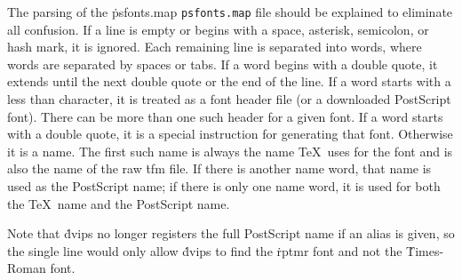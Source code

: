 The parsing of the \.{psfonts.map}
\^{{\tt psfonts.map}}
file should be explained to eliminate all confusion.  If a line is
empty or begins with a space, asterisk, semicolon, or hash mark, it is
ignored.  Each remaining line is separated into words, where words are
separated by spaces or tabs.  If a word begins with a double quote, it
extends until the next double quote or the end of the line.  If a word
starts with a less than character, it is treated as a font header file
(or a downloaded PostScript font).  There can be more than one such
header for a given font.  If a word starts with a double quote, it is
a special instruction for generating that font.  Otherwise it is a
name.  The first such name is always the name \TeX\ uses for the font
and is also the name of the raw \.{tfm} file.  If there is another
name word, that name is used as the PostScript name; if there is only
one name word, it is used for both the \TeX\ name and the PostScript
name.

Note that \.{dvips} no longer registers the full PostScript name if an
alias is given, so the single line
\noindent
would only allow \.{dvips} to find the \.{rptmr} font and not the
\.{Times-Roman} font.


